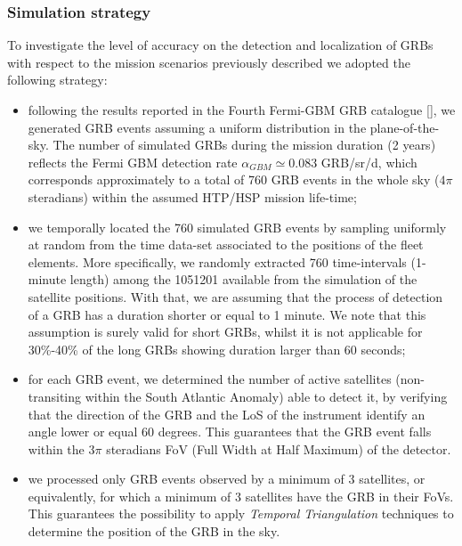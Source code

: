 \documentclass[]{spie}  %
\begin{document}
\subsubsection{Simulation strategy}
To investigate the level of accuracy on the detection and localization of GRBs with respect to the mission scenarios previously described we adopted the following strategy: 
\begin{itemize}
	
\item following the results reported in the Fourth Fermi-GBM GRB catalogue [], we generated GRB events assuming a uniform distribution in the plane-of-the-sky. The number of simulated GRBs during the mission duration (2 years) reflects the Fermi GBM detection rate $\alpha_{GBM} \simeq 0.083$ GRB/sr/d, which corresponds approximately to a total of 760 GRB events in the whole sky ($4\pi$ steradians) within the assumed HTP/HSP mission life-time; 

\item we temporally located the 760 simulated GRB events by sampling uniformly at random from the time data-set associated to the positions of the fleet elements. More specifically, we randomly extracted 760 time-intervals (1-minute length) among the 1051201 available from the simulation of the satellite positions. With that, we are assuming that the process of detection of a GRB has a duration shorter or equal to 1 minute. We note that this assumption is surely valid for short GRBs, whilst it is not applicable for 30\%-40\% of the long GRBs showing duration larger than 60 seconds; 

\item for each GRB event, we determined the number of active satellites (non-transiting within the South Atlantic Anomaly) able to detect it, by verifying that the direction of the GRB and the LoS of the instrument identify an angle lower or equal 60 degrees. This guarantees that the GRB event falls within the $3\pi$ steradians FoV (Full Width at Half Maximum) of the detector. 

\item we processed only GRB events observed by a minimum of 3 satellites, or equivalently, for which a minimum of 3 satellites have the GRB in their FoVs. This guarantees the possibility to apply \emph{Temporal Triangulation} techniques to determine the position of the GRB in the sky. 

\end{itemize}
\end{document}
